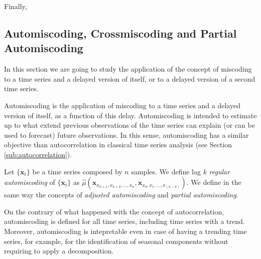 Finally, 

\subsection{Automiscoding, Crossmiscoding and Partial Automiscoding}

In this section we are going to study the application of the concept of miscoding to a time series and a delayed version of itself, or to a delayed version of a second time series.

Automiscoding is the application of miscoding to a time series and a delayed version of itself, as a function of this delay. Automiscoding is intended to estimate up to what extend previous observations of the time series can explain (or can be used to forecast) future observations. In this sense, automiscoding has a similar objective than autocorrelation in classical time series analysis (see Section \ref{sub:autocorrelation}).

\begin{definition}
Let $\{\mathbf{x}_t\}$ be a time series composed by $n$ samples. We define lag $k$ \emph{regular automiscoding} of $\{\mathbf{x}_t\}$ as $\hat\mu(\mathbf{x}_{x_{k+1}, x_{k+2}, \ldots, x_n}, \mathbf{x}_{x_0, x_1, \ldots, x_{(n-k)}})$. We define in the same way the concepts of \emph{adjusted automiscoding} and \emph{partial automiscoding}.
\end{definition}

On the contrary of what happened with the concept of autocorrelation, automiscoding is defined for all time series, including time series with a trend. Moreover, automiscoding is intepretable even in case of having a trending time series, for example, for the identification of seasonal components without requiring to apply a decomposition.


